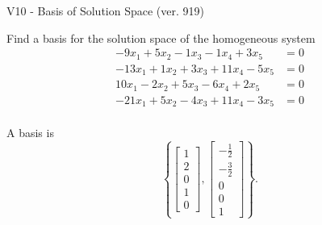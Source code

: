 \begin{exercise}
  \begin{exerciseTitle}V10 - Basis of Solution Space (ver. 919)\end{exerciseTitle}
  \begin{exerciseStatement}
    Find a basis for the solution space of the homogeneous system 
\begin{align*}
 -9 x_ 1 + 5 x_ 2 -1 x_ 3 -1 x_ 4 + 3 x_ 5 &= 0  \\ 
  -13 x_ 1 + 1 x_ 2 + 3 x_ 3 + 11 x_ 4 -5 x_ 5 &= 0  \\ 
  10 x_ 1 -2 x_ 2 + 5 x_ 3 -6 x_ 4 + 2 x_ 5 &= 0  \\ 
  -21 x_ 1 + 5 x_ 2 -4 x_ 3 + 11 x_ 4 -3 x_ 5 &= 0  \\ 
 \end{align*}


 
  \end{exerciseStatement}

  \begin{exerciseAnswer}
   A basis is   
\[\left\{\left[\begin{array}{c}
1 \\
2 \\
0 \\
1 \\
0
\end{array}\right] , \left[\begin{array}{c}
-\frac{1}{2} \\
-\frac{3}{2} \\
0 \\
0 \\
1
\end{array}\right]\right\}.\]

  


  \end{exerciseAnswer}
\end{exercise}